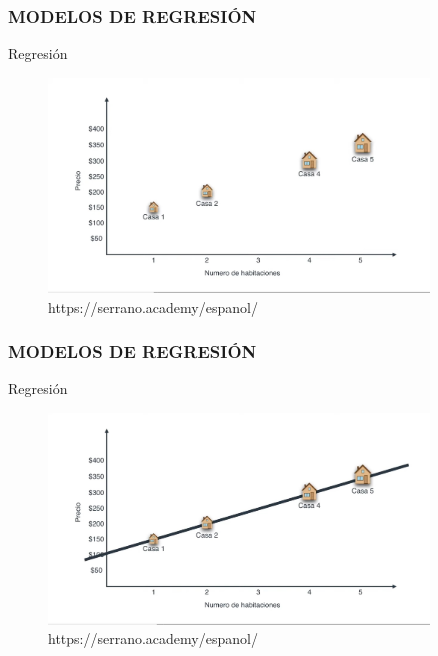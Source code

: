 \documentclass{beamer}
\begin{document}
\begin{frame}
	\frametitle{MODELOS DE REGRESIÓN}
\begin{block}{Regresión}	
		\begin{figure}
			\includegraphics[width=0.9\textwidth]{imagenes_regresion/IMG_3484.jpg}
			\caption{https://serrano.academy/espanol/}
		\end{figure}
	\end{block}
\end{frame}

\begin{frame}
	\frametitle{MODELOS DE REGRESIÓN}
	\begin{block}{Regresión}	
		\begin{figure}
			\includegraphics[width=0.9\textwidth]{imagenes_regresion/IMG_3485.jpg}
		\caption{https://serrano.academy/espanol/}
		\end{figure}
	\end{block}
\end{frame}
\end{document}
